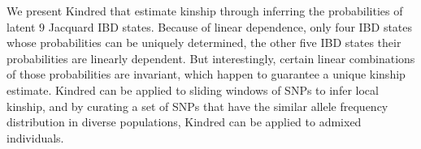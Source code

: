 \documentclass[11pt,Times]{article}
\begin{document}
We present Kindred that estimate kinship through inferring the probabilities of latent $9$ Jacquard IBD states.  Because of linear dependence, only four IBD states whose probabilities can be uniquely determined, the other five IBD states their probabilities are linearly dependent. But interestingly, certain linear combinations of those probabilities are invariant, which happen to guarantee a unique kinship estimate.  Kindred can be applied to sliding windows of SNPs to infer local kinship, and by curating a set of SNPs that have the similar allele frequency distribution in diverse populations, Kindred can be applied to admixed individuals.  




\end{document}
